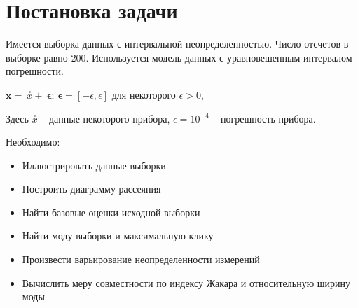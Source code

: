 \documentclass[./main.tex]{subfiles}
\begin{document}
\section{Постановка задачи}

Имеется выборка данных с интервальной неопределенностью. Число отсчетов в выборке равно 200.
Используется модель данных с  уравновешенным интервалом погрешности.

$\boldsymbol{x} = \ \stackrel{\circ}{x} + \ \boldsymbol{\epsilon}$; \quad $\boldsymbol{\epsilon} = [-\epsilon, \epsilon]$  для некоторого $\epsilon >0 $, 

Здесь $\stackrel{\circ}{x}$ -- данные некоторого прибора, $\epsilon = 10 ^ {-4}$ -- погрешность прибора. 
\par

Необходимо:
\begin{itemize}
	\item Иллюстрировать данные выборки
	\item Построить диаграмму рассеяния
	\item Найти базовые оценки исходной выборки
	\item Найти моду выборки и максимальную клику
	\item Произвести варьирование неопределенности измерений
	\item Вычислить меру совместности по индексу Жакара и относительную ширину моды
\end{itemize}

\newpage
\end{document}
